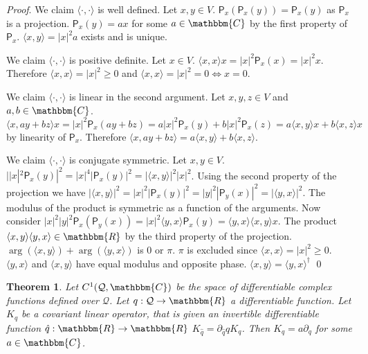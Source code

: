 \documentclass[aps,pra,10pt,twocolumn,floatfix,nofootinbib]{revtex4-1}
\numberwithin{equation}{section}
\newtheorem{thrm}[equation]{Theorem}
\theoremstyle{definition}
\renewenvironment{proof}{\emph{Proof}.}{\qed}
\begin{document}
\begin{proof}
	We claim $\langle \cdot , \cdot \rangle$ is well defined. Let $x, y \in V$. $\mathsf{P}_x (\mathsf{P}_x (y)) =\mathsf{P}_x(y)$ as $\mathsf{P}_x$ is a projection. $\mathsf{P}_x(y) = a x $ for some $a \in \mathbbm{C}$ by the first property of $\mathsf{P}_x$. $\langle x , y \rangle = |x|^2 a$ exists and is unique. 
	
	We claim $\langle \cdot , \cdot \rangle$ is positive definite. Let $x \in V$. $\langle x , x \rangle x = |x|^2 \mathsf{P}_x(x) = |x|^2 x $. Therefore $\langle x , x \rangle = |x|^2 \ge 0$ and $\langle x , x \rangle = |x|^2 = 0 \Leftrightarrow x = 0$.
	
	We claim $\langle \cdot , \cdot \rangle$ is linear in the second argument. Let $x,y,z \in V$ and $a,b \in \mathbbm{C}$. $\langle x , a y + b z \rangle x = |x|^2 \mathsf{P}_x(a y + b z)=a  |x|^2 \mathsf{P}_x(y) + b  |x|^2 \mathsf{P}_x(z) = a \langle x , y \rangle x + b \langle x, z \rangle x$ by linearity of $\mathsf{P}_x$. Therefore $\langle x , a y + b z \rangle = a \langle x , y \rangle + b \langle x, z \rangle$.
	
	We claim $\langle \cdot , \cdot \rangle$ is conjugate symmetric. Let $x,y \in V$. $ | |x|^2\mathsf{P}_x(y)|^2 = |x|^4|\mathsf{P}_x(y)|^2 = |\langle x , y \rangle|^2 |x|^2$. Using the second property of the projection we have $|\langle x , y \rangle|^2 = |x|^2|\mathsf{P}_x(y)|^2 =  |y|^2|\mathsf{P}_y(x)|^2 = |\langle y , x \rangle|^2$. The modulus of the product is symmetric as a function of the arguments. Now consider $|x|^2|y|^2\mathsf{P}_x(\mathsf{P}_y(x)) = |x|^2 \langle y , x \rangle \mathsf{P}_x(y) = \langle y , x \rangle \langle x , y \rangle x$. The product $\langle x , y \rangle \langle y , x \rangle \in \mathbbm{R}$ by the third property of the projection. $\arg(\langle x , y \rangle) + \arg(\langle y , x \rangle)$ is $0$ or $\pi$. $\pi$ is excluded since $\langle x , x \rangle = |x|^2 \ge 0$. $\langle y , x \rangle$ and $\langle x , y \rangle$ have equal modulus and opposite phase. $\langle x , y \rangle = \langle y , x \rangle^\dagger$
\end{proof}

\begin{thrm}
	Let $C^1(\mathcal{Q}, \mathbbm{C})$ be the space of differentiable complex functions defined over $\mathcal{Q}$. Let $q : \mathcal{Q} \rightarrow \mathbbm{R}$ a differentiable function. Let $K_q$ be a covariant linear operator, that is given an invertible differentiable function $\hat{q} : \mathbbm{R} \rightarrow \mathbbm{R}$ $K_{\hat{q}} = \partial_{\hat{q}} q K_{q}$. Then $K_q = a \partial_q$ for some $a \in \mathbbm{C}$.
\end{thrm}
\end{document}
